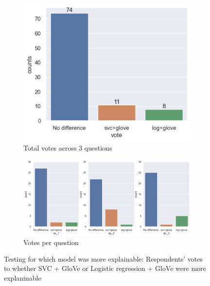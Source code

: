 \begin{figure}[!ht]
    \begin{subfigure}[b]{0.75\textwidth}
      \centering
      \includegraphics[width=1\linewidth]{figures/part4_votes.png}
      \caption{Total votes across 3 questions}
    \end{subfigure}
    \hfill
    \begin{subfigure}[b]{1\textwidth}
      \centering
      \includegraphics[width=1\linewidth]{figures/part_4_votes_1.png}
      \caption{Votes per question}
    \end{subfigure}
    \caption{Testing for which model was more explainable: Respondents' votes to whether SVC + GloVe or Logistic regression + GloVe were more explaninable}
    \label{fig:part4}
\end{figure}

